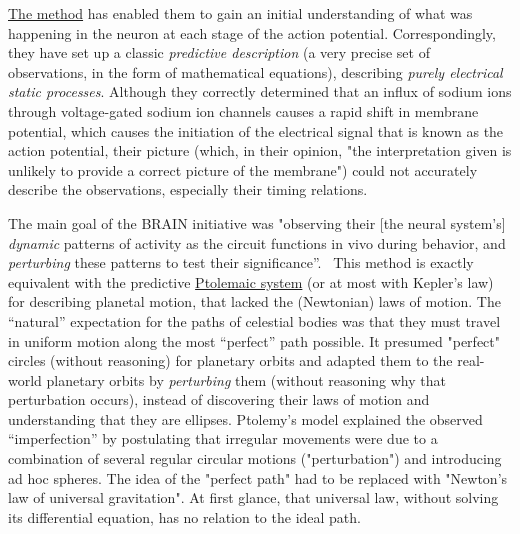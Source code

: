 \hyperlink{HHmeasurements}{The method} has enabled them to gain an initial understanding of what was happening in the neuron at each stage of the action potential.
Correspondingly, they have set up a classic \textit{predictive description} (a very precise set of observations, in the form of mathematical equations), describing \textit{purely electrical static processes}. Although they correctly determined that an influx of sodium ions through voltage-gated sodium ion channels causes a rapid shift in membrane potential, which causes the initiation of the electrical signal that is known as the action potential, their picture (which, in their opinion, "the interpretation given is unlikely to provide a correct picture of the membrane") could not accurately describe
the observations, especially their timing relations.
 
The main goal of the BRAIN initiative was
"observing their [the neural system's] \textit{dynamic} patterns of activity
as the circuit functions in vivo during behavior,
and \textit{perturbing} these patterns to test their significance”.~\cite{NIHBrainStrategy:2020}
This method is exactly equivalent with the predictive
\href{https://www.britannica.com/science/Ptolemaic-system}{Ptolemaic system}
(or at most with Kepler's law)
for describing planetal motion, that lacked the (Newtonian) laws of motion. The “natural” expectation for the paths of celestial bodies was that they must travel in uniform motion along the most “perfect” path possible.
It presumed "perfect" circles (without reasoning) for planetary orbits and adapted them to the real-world planetary orbits by \textit{perturbing} them (without reasoning why that perturbation occurs), instead of discovering their laws of motion and understanding that they are ellipses.
Ptolemy’s model explained the observed “imperfection” by postulating that irregular movements were due to a combination of several regular circular motions ("perturbation")
and introducing ad hoc spheres.
The idea of the "perfect path" had to be replaced with "Newton's law of universal gravitation".
At first glance, that universal law, without solving its differential equation, has no relation to the ideal path.

